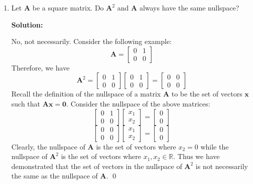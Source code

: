 \begin{enumerate}[label=(\alph*)]
	\item Let $\mathbf{A}$ be a square matrix. Do $\mathbf{A}^2$ and
	      $\mathbf{A}$ always have the same nullspace?

	      \par \textbf{Solution:}
	      \par No, not necessarily. Consider the following example:
	      $$ \mathbf{A} = \left[\begin{array}{cc}
				      0 & 1 \\
				      0 & 0
			      \end{array}\right] $$
	      Therefore, we have
	      $$ \mathbf{A}^2 =
		      \left[\begin{array}{cc}
				      0 & 1 \\
				      0 & 0
			      \end{array}\right]
		      \left[\begin{array}{cc}
				      0 & 1 \\
				      0 & 0
			      \end{array}\right]
		      =
		      \left[\begin{array}{cc}
				      0 & 0 \\
				      0 & 0
			      \end{array}\right]
	      $$
	      Recall the definition of the nullspace of a matrix $\mathbf{A}$ to be
	      the set of vectors $\mathbf{x}$ such that $\mathbf{Ax} = \mathbf{0}$.
	      Consider the nullspace of the above matrices:
	      $$
		      \left[\begin{array}{cc}
				      0 & 1 \\
				      0 & 0
			      \end{array}\right]
		      \left[\begin{array}{c}
				      x_1 \\
				      x_2
			      \end{array}\right]
		      =
		      \left[\begin{array}{c}
				      0 \\
				      0
			      \end{array}\right]
	      $$
	      $$
		      \left[\begin{array}{cc}
				      0 & 0 \\
				      0 & 0
			      \end{array}\right]
		      \left[\begin{array}{c}
				      x_1 \\
				      x_2
			      \end{array}\right]
		      =
		      \left[\begin{array}{c}
				      0 \\
				      0
			      \end{array}\right]
	      $$
	      Clearly, the nullspace of $\mathbf{A}$ is the set of vectors where
	      $x_2 = 0$ while the nullspace of $\mathbf{A}^2$ is the set of vectors
	      where $x_1, x_2 \in \mathbb{R}$. Thus we have demonstrated that the
	      set of vectors in the nullspace of $\mathbf{A}^2$ is not necessarily
	      the same as the nullspace of $\mathbf{A}$. \qed


\end{enumerate}
